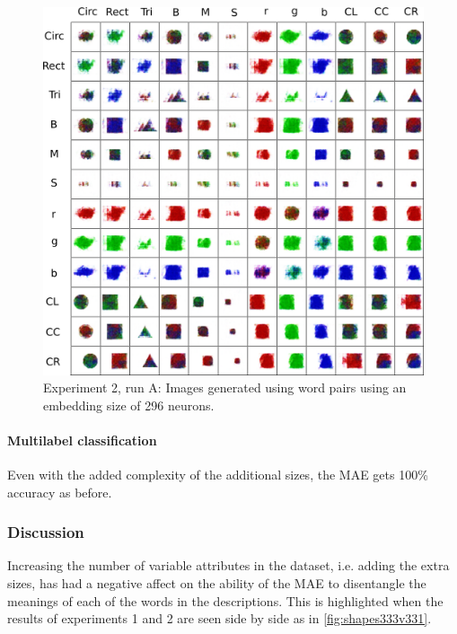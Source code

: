 \begin{figure}
\centering
\includegraphics[width=\textwidth]{Figs/shapes/2word333A.png}
\caption{Experiment 2, run A:  Images generated using word pairs using an embedding size of 296 neurons.}
\label{fig:2word333}
\end{figure}

\paragraph{Multilabel classification}
Even with the added complexity of the additional sizes, the MAE gets 100\% accuracy as before. 


\subsubsection{Discussion}

Increasing the number of variable attributes in the dataset, i.e. adding the extra sizes, has had a negative affect on the ability of the MAE to disentangle the meanings of each of the words in the descriptions. This is highlighted when the results of experiments 1 and 2 are seen side by side as in \autoref{fig:shapes333v331}.

